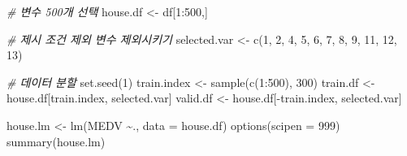 \documentclass[
]{article}
\newenvironment{Shaded}{\begin{snugshade}}{\end{snugshade}}
\newcommand{\AttributeTok}[1]{\textcolor[rgb]{0.77,0.63,0.00}{#1}}
\newcommand{\CommentTok}[1]{\textcolor[rgb]{0.56,0.35,0.01}{\textit{#1}}}
\newcommand{\DecValTok}[1]{\textcolor[rgb]{0.00,0.00,0.81}{#1}}
\newcommand{\FunctionTok}[1]{\textcolor[rgb]{0.00,0.00,0.00}{#1}}
\newcommand{\NormalTok}[1]{#1}
\newcommand{\OtherTok}[1]{\textcolor[rgb]{0.56,0.35,0.01}{#1}}
\newcommand{\SpecialCharTok}[1]{\textcolor[rgb]{0.00,0.00,0.00}{#1}}
\begin{document}
\begin{Shaded}
\begin{Highlighting}[]
\CommentTok{\# 변수 500개 선택 }
\NormalTok{house.df }\OtherTok{\textless{}{-}}\NormalTok{ df[}\DecValTok{1}\SpecialCharTok{:}\DecValTok{500}\NormalTok{,]}

\CommentTok{\# 제시 조건 제외 변수 제외시키기 }
\NormalTok{selected.var }\OtherTok{\textless{}{-}} \FunctionTok{c}\NormalTok{(}\DecValTok{1}\NormalTok{, }\DecValTok{2}\NormalTok{,  }\DecValTok{4}\NormalTok{, }\DecValTok{5}\NormalTok{, }\DecValTok{6}\NormalTok{, }\DecValTok{7}\NormalTok{, }\DecValTok{8}\NormalTok{, }\DecValTok{9}\NormalTok{, }\DecValTok{11}\NormalTok{, }\DecValTok{12}\NormalTok{, }\DecValTok{13}\NormalTok{)}

\CommentTok{\# 데이터 분할 }
\FunctionTok{set.seed}\NormalTok{(}\DecValTok{1}\NormalTok{)}
\NormalTok{train.index }\OtherTok{\textless{}{-}} \FunctionTok{sample}\NormalTok{(}\FunctionTok{c}\NormalTok{(}\DecValTok{1}\SpecialCharTok{:}\DecValTok{500}\NormalTok{), }\DecValTok{300}\NormalTok{)}
\NormalTok{train.df }\OtherTok{\textless{}{-}}\NormalTok{ house.df[train.index, selected.var]}
\NormalTok{valid.df }\OtherTok{\textless{}{-}}\NormalTok{ house.df[}\SpecialCharTok{{-}}\NormalTok{train.index, selected.var]}

\NormalTok{house.lm }\OtherTok{\textless{}{-}} \FunctionTok{lm}\NormalTok{(MEDV }\SpecialCharTok{\textasciitilde{}}\NormalTok{., }\AttributeTok{data =}\NormalTok{ house.df)}
\FunctionTok{options}\NormalTok{(}\AttributeTok{scipen =} \DecValTok{999}\NormalTok{)}
\FunctionTok{summary}\NormalTok{(house.lm)}
\end{Highlighting}
\end{Shaded}
\end{document}
